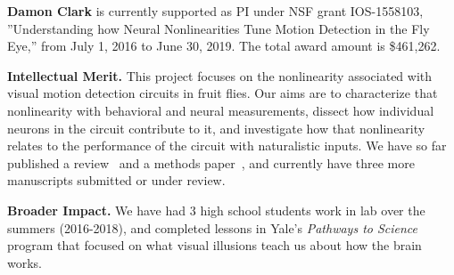 \vskip10pt \textbf{Damon Clark} is currently supported as PI under NSF
grant IOS-1558103, ''Understanding how Neural Nonlinearities Tune
Motion Detection in the Fly Eye,'' from July 1, 2016 to June 30, 2019.
The total award amount is \$461,262.

{\bf Intellectual Merit.} This project focuses on the nonlinearity
associated with visual motion detection circuits in fruit flies. Our
aims are to characterize that nonlinearity with behavioral and neural
measurements, dissect how individual neurons in the circuit contribute
to it, and investigate how that nonlinearity relates to the
performance of the circuit with naturalistic inputs. We have so far
published a review~\citep{clark:16} and a methods
paper~\citep{mano:17}, and currently have three more manuscripts
submitted or under review.

{\bf Broader Impact.} We have had 3 high school students work in lab
over the summers (2016-2018), and completed lessons in Yale's
\textit{Pathways to Science} program that focused on what visual
illusions teach us about how the brain works.


